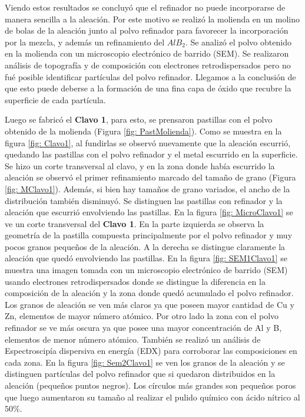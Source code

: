 \documentclass[a4paper,12pt,fleqn,twoside,openany]{book}
\begin{document}
Viendo estos resultados se concluyó que el refinador no puede incorporarse de manera sencilla a la aleación. Por este motivo se realizó la molienda en un molino de bolas de la aleación junto al polvo refinador para favorecer la incorporación por la mezcla, y además un refinamiento del $AlB_2$. Se analizó el polvo obtenido en la molienda con un microscopio electrónico de barrido (SEM). Se realizaron análisis de topografía y de composición con electrones retrodispersados pero no fué posible identificar partículas del polvo refinador. Llegamos a la conclusión de que esto puede deberse a la formación de una fina capa de óxido que recubre la superficie de cada partícula. 

Luego se fabricó el \textbf{Clavo 1}, para esto, se prensaron pastillas con el polvo obtenido de la molienda (Figura \ref{fig: PastMolienda}). Como se muestra en la figura \ref{fig: Clavo1}, al fundirlas se observó nuevamente que la aleación escurrió, quedando las pastillas con el polvo refinador y el metal escurrido en la superficie. Se hizo un corte transversal al clavo, y en la zona donde había escurrido la aleación se observó el primer refinamiento marcado del tamaño de grano (Figura \ref{fig: MClavo1}). Además, si bien hay tamaños de grano variados, el ancho de la distribución también disminuyó.  Se distinguen las pastillas con refinador y la aleación que escurrió envolviendo las pastillas. En la figura \ref{fig: MicroClavo1} se ve un corte transversal del \textbf{Clavo 1}. En la parte izquierda se observa la geometría de la pastilla compuesta principalmente por el polvo refinador y muy pocos granos pequeños de la aleación. A la derecha se distingue claramente la aleación que quedó envolviendo las pastillas. En la figura \ref{fig: SEM1Clavo1} se muestra una imagen tomada con un microscopio electrónico de barrido (SEM) usando electrones retrodispersados donde se distingue la diferencia en la composición de la aleación y la zona donde quedó acumulado el polvo refinador. Los granos de aleación se ven más claros ya que poseen mayor cantidad de Cu y Zn, elementos de mayor número atómico. Por otro lado la zona con el polvo refinador se ve más oscura ya que posee una mayor concentración de Al y B, elementos de menor número atómico. También se realizó un análisis de Espectroscipía dispersiva en energía (EDX) para corroborar las composiciones en cada zona. En la figura \ref{fig: Sem2Clavo1} se ven los granos de la aleación y se distinguen partículas del polvo refinador que si quedaron distribuidos en la aleación (pequeños puntos negros). Los círculos más grandes son pequeños poros que luego aumentaron su tamaño al realizar el pulido químico con ácido nítrico al $50 \%$.
\end{document}
